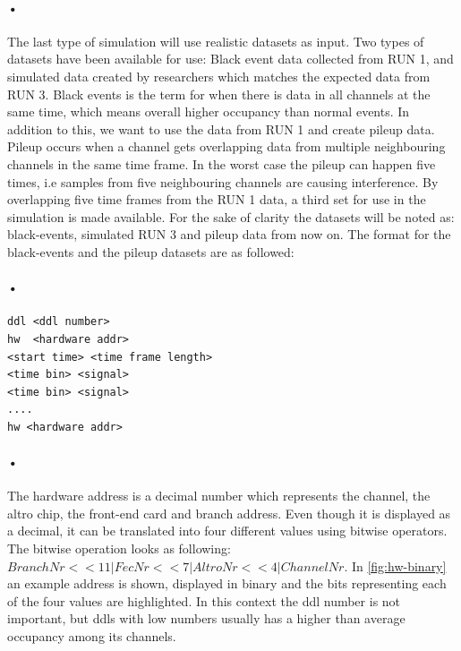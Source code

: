 \documentclass[a4paper, 12pt, openright, twoside]{report}
\begin{document}
\paragraph{•}
The last type of simulation will use realistic datasets as input. 
Two types of datasets have been available for use: Black event data collected from RUN 1, and simulated data created by researchers which matches the expected data from RUN 3.
Black events is the term for when there is data in all channels at the same time, which means overall higher occupancy than normal events.
In addition to this, we want to use the data from RUN 1 and create pileup data.
Pileup occurs when a channel gets overlapping data from multiple neighbouring channels in the same time frame.
In the worst case the pileup can happen five times, i.e samples from five neighbouring channels are causing interference.
By overlapping five time frames from the RUN 1 data, a third set for use in the simulation is made available.
For the sake of clarity the datasets will be noted as: black-events, simulated RUN 3 and pileup data from now on.
The format for the black-events and the pileup datasets are as followed:

\paragraph{•}
\begin{minipage}{\linewidth}
\begin{lstlisting}[caption=Format for the black-event and pileup dataset., label=lst:black-event-format]
ddl <ddl number>
hw  <hardware addr>
<start time> <time frame length>
<time bin> <signal>
<time bin> <signal>
....
hw <hardware addr>
\end{lstlisting}
\end{minipage}

\paragraph{•}
The hardware address is a decimal number which represents the channel, the \gls{altro} chip, the front-end card and branch address.
Even though it is displayed as a decimal, it can be translated into four different values using bitwise operators.
The bitwise operation looks as following: $BranchNr << 11 | FecNr << 7 | AltroNr << 4 | ChannelNr $.
In \ref{fig:hw-binary} an example address is shown, displayed in binary and the bits representing each of the four values are highlighted.
In this context the ddl number is not important, but ddls with low numbers usually has a higher than average occupancy among its channels.
\end{document}
